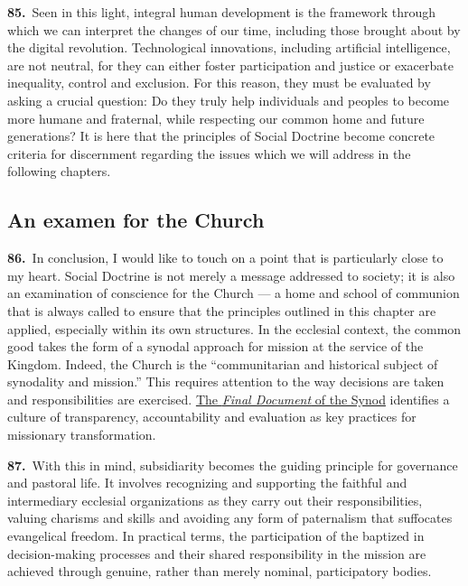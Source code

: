 \documentclass{article}
\begin{document}
\textbf{85.}\ Seen in this light, integral human development is the framework through which we can interpret the changes of our time, including those brought about by the digital revolution. Technological innovations, including artificial intelligence, are not neutral, for they can either foster participation and justice or exacerbate inequality, control and exclusion. For this reason, they must be evaluated by asking a crucial question: Do they truly help individuals and peoples to become more humane and fraternal, while respecting our common home and future generations? It is here that the principles of Social Doctrine become concrete criteria for discernment regarding the issues which we will address in the following chapters.

\subsection{An examen for the Church}

\textbf{86.}\ In conclusion, I would like to touch on a point that is particularly close to my heart. Social Doctrine is not merely a message addressed to society; it is also an examination of conscience for the Church --- a home and school of communion that is always called to ensure that the principles outlined in this chapter are applied, especially within its own structures. In the ecclesial context, the common good takes the form of a synodal approach for mission at the service of the Kingdom. Indeed, the Church is the ``communitarian and historical subject of synodality and mission.''\cite{n113} This requires attention to the way decisions are taken and responsibilities are exercised. \href{https://www.synod.va/content/dam/synod/news/2024-10-26_final-document/ENG---Documento-finale.pdf}{The \emph{Final Document} of the Synod} identifies a culture of transparency, accountability and evaluation as key practices for missionary transformation.\cite{n114}

\textbf{87.}\ With this in mind, subsidiarity becomes the guiding principle for governance and pastoral life. It involves recognizing and supporting the faithful and intermediary ecclesial organizations as they carry out their responsibilities, valuing charisms and skills and avoiding any form of paternalism that suffocates evangelical freedom. In practical terms, the participation of the baptized in decision-making processes and their shared responsibility in the mission are achieved through genuine, rather than merely nominal, participatory bodies.\cite{n115}
\end{document}
